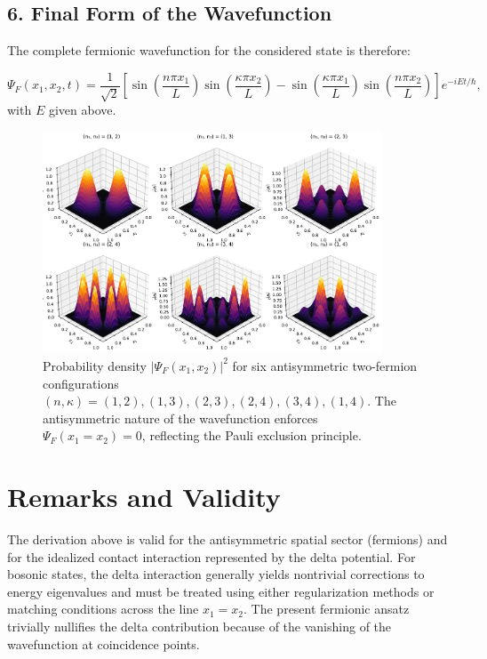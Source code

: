 \subsection*{6. Final Form of the Wavefunction}

The complete fermionic wavefunction for the considered state is therefore:


\begin{equation}
    \Psi_F(x_1, x_2, t) = \frac{1}{\sqrt{2}}
    \left[
    \sin\left(\frac{n\pi x_1}{L}\right)\sin\left(\frac{\kappa\pi x_2}{L}\right)
    - \sin\left(\frac{\kappa\pi x_1}{L}\right)\sin\left(\frac{n\pi x_2}{L}\right)
    \right]
    e^{-iEt/\hbar},
\end{equation}
with $E$ given above.

\begin{figure}[h!]
    \centering
    \includegraphics[width=0.9\textwidth]{ figures/fermions_3D_collage(1).pdf}
    \caption{Probability density $|\Psi_F(x_1, x_2)|^2$ for six antisymmetric two-fermion configurations
    $(n,\kappa) = (1,2), (1,3), (2,3), (2,4), (3,4), (1,4)$.
    The antisymmetric nature of the wavefunction enforces $\Psi_F(x_1 = x_2) = 0$, reflecting the Pauli exclusion principle.}
    \label{fig:fermion_3D_collage}
\end{figure}


\section{Remarks and Validity}

The derivation above is valid for the antisymmetric spatial sector (fermions) and for the idealized contact interaction represented by the delta potential. For bosonic states, the delta interaction generally yields nontrivial corrections to energy eigenvalues and must be treated using either regularization methods or matching conditions across the line $x_1=x_2$. The present fermionic ansatz trivially nullifies the delta contribution because of the vanishing of the wavefunction at coincidence points.
